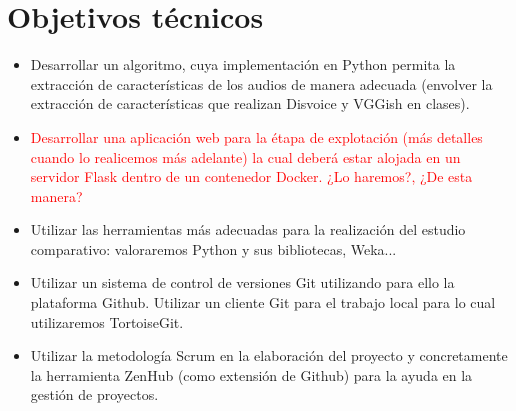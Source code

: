 \section{Objetivos técnicos}
\begin{itemize}
	\item Desarrollar un algoritmo, cuya implementación en Python permita la extracción de características de los audios de manera adecuada (envolver la extracción de características que realizan Disvoice y VGGish en clases).
	\item \textcolor{red}{Desarrollar una aplicación web para la étapa de explotación (más detalles cuando lo realicemos más adelante) la cual deberá estar alojada en un servidor Flask dentro de un contenedor Docker. ¿Lo haremos?, ¿De esta manera?}
	\item Utilizar las herramientas más adecuadas para la realización del estudio comparativo: valoraremos Python y sus bibliotecas, Weka...
	\item Utilizar un sistema de control de versiones Git utilizando para ello la plataforma Github. Utilizar un cliente Git para el trabajo local para lo cual utilizaremos TortoiseGit.
	\item Utilizar la metodología Scrum en la elaboración del proyecto y concretamente la herramienta ZenHub (como extensión de Github) para la ayuda en la gestión de proyectos.
	
	
\end{itemize}